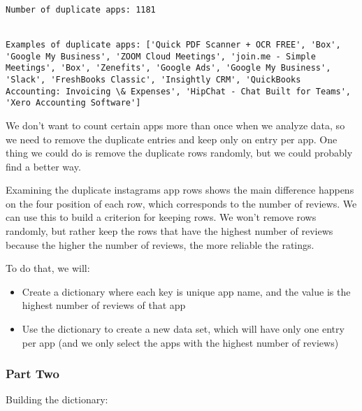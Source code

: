 \documentclass[11pt]{article}
\providecommand{\tightlist}{%
      \setlength{\itemsep}{0pt}\setlength{\parskip}{0pt}}
\begin{document}
    \begin{Verbatim}[commandchars=\\\{\}]
Number of duplicate apps: 1181


Examples of duplicate apps: ['Quick PDF Scanner + OCR FREE', 'Box', 'Google My Business', 'ZOOM Cloud Meetings', 'join.me - Simple Meetings', 'Box', 'Zenefits', 'Google Ads', 'Google My Business', 'Slack', 'FreshBooks Classic', 'Insightly CRM', 'QuickBooks Accounting: Invoicing \& Expenses', 'HipChat - Chat Built for Teams', 'Xero Accounting Software']

    \end{Verbatim}

    We don't want to count certain apps more than once when we analyze data,
so we need to remove the duplicate entries and keep only on entry per
app. One thing we could do is remove the duplicate rows randomly, but we
could probably find a better way.

    Examining the duplicate instagrams app rows shows the main difference
happens on the four position of each row, which corresponds to the
number of reviews. We can use this to build a criterion for keeping
rows. We won't remove rows randomly, but rather keep the rows that have
the highest number of reviews because the higher the number of reviews,
the more reliable the ratings.

    To do that, we will:

    \begin{itemize}
\tightlist
\item
  Create a dictionary where each key is unique app name, and the value
  is the highest number of reviews of that app
\item
  Use the dictionary to create a new data set, which will have only one
  entry per app (and we only select the apps with the highest number of
  reviews)
\end{itemize}

    \subsubsection{Part Two}\label{part-two}

    Building the dictionary:
\end{document}
